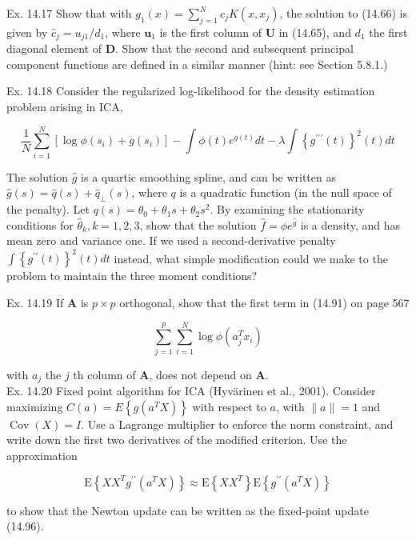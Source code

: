\documentclass[10pt]{article}
\begin{document}
Ex. 14.17 Show that with $g_{1}(x)=\sum_{j=1}^{N} c_{j} K\left(x, x_{j}\right)$, the solution to (14.66) is given by $\hat{c}_{j}=u_{j 1} / d_{1}$, where $\mathbf{u}_{1}$ is the first column of $\mathbf{U}$ in (14.65), and $d_{1}$ the first diagonal element of $\mathbf{D}$. Show that the second and subsequent principal component functions are defined in a similar manner (hint: see Section 5.8.1.)

Ex. 14.18 Consider the regularized log-likelihood for the density estimation problem arising in ICA,


\begin{equation*}
\frac{1}{N} \sum_{i=1}^{N}\left[\log \phi\left(s_{i}\right)+g\left(s_{i}\right)\right]-\int \phi(t) e^{g(t)} d t-\lambda \int\left\{g^{\prime \prime \prime}(t)\right\}^{2}(t) d t \tag{14.118}
\end{equation*}


The solution $\hat{g}$ is a quartic smoothing spline, and can be written as $\hat{g}(s)= \hat{q}(s)+\hat{q}_{\perp}(s)$, where $q$ is a quadratic function (in the null space of the penalty). Let $q(s)=\theta_{0}+\theta_{1} s+\theta_{2} s^{2}$. By examining the stationarity conditions for $\hat{\theta}_{k}, k=1,2,3$, show that the solution $\hat{f}=\phi e^{\hat{g}}$ is a density, and has mean zero and variance one. If we used a second-derivative penalty $\int\left\{g^{\prime \prime}(t)\right\}^{2}(t) d t$ instead, what simple modification could we make to the problem to maintain the three moment conditions?

Ex. 14.19 If $\mathbf{A}$ is $p \times p$ orthogonal, show that the first term in (14.91) on page 567

$$
\sum_{j=1}^{p} \sum_{i=1}^{N} \log \phi\left(a_{j}^{T} x_{i}\right)
$$

with $a_{j}$ the $j$ th column of $\mathbf{A}$, does not depend on $\mathbf{A}$.\\
Ex. 14.20 Fixed point algorithm for ICA (Hyvärinen et al., 2001). Consider maximizing $C(a)=E\left\{g\left(a^{T} X\right)\right\}$ with respect to $a$, with $\|a\|=1$ and $\operatorname{Cov}(X)=I$. Use a Lagrange multiplier to enforce the norm constraint, and write down the first two derivatives of the modified criterion. Use the approximation

$$
\mathrm{E}\left\{X X^{T} g^{\prime \prime}\left(a^{T} X\right)\right\} \approx \mathrm{E}\left\{X X^{T}\right\} \mathrm{E}\left\{g^{\prime \prime}\left(a^{T} X\right)\right\}
$$

to show that the Newton update can be written as the fixed-point update (14.96).
\end{document}
